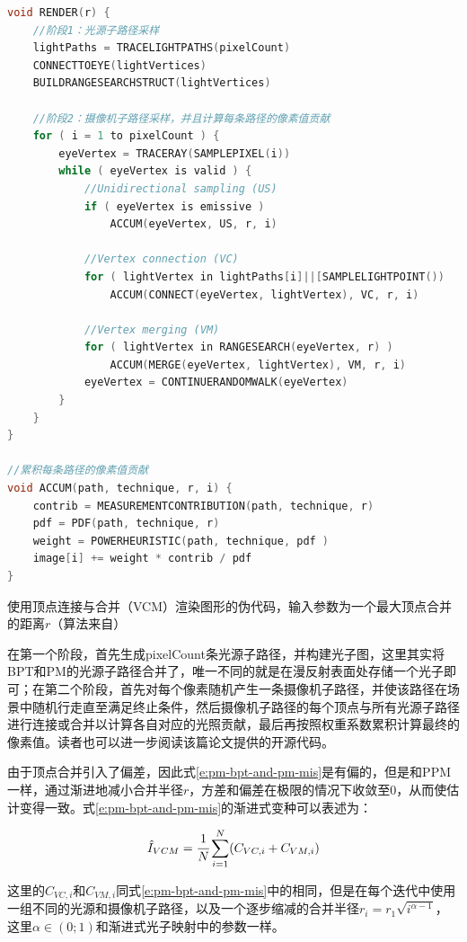 \begin{algorithm}
\begin{lstlisting}[language=C++, mathescape]
void RENDER(r) {
	//阶段1：光源子路径采样
	lightPaths = TRACELIGHTPATHS(pixelCount) 
	CONNECTTOEYE(lightVertices) 
	BUILDRANGESEARCHSTRUCT(lightVertices)
	
	//阶段2：摄像机子路径采样，并且计算每条路径的像素值贡献
	for ( i = 1 to pixelCount ) {
		eyeVertex = TRACERAY(SAMPLEPIXEL(i)) 
		while ( eyeVertex is valid ) {
			//Unidirectional sampling (US) 
			if ( eyeVertex is emissive )
				ACCUM(eyeVertex, US, r, i) 
			
			//Vertex connection (VC)
			for ( lightVertex in lightPaths[i]||[SAMPLELIGHTPOINT()) 
				ACCUM(CONNECT(eyeVertex, lightVertex), VC, r, i) 
		
			//Vertex merging (VM)
			for ( lightVertex in RANGESEARCH(eyeVertex, r) )
				ACCUM(MERGE(eyeVertex, lightVertex), VM, r, i) 
			eyeVertex = CONTINUERANDOMWALK(eyeVertex) 
		}
	}
}
		
//累积每条路径的像素值贡献
void ACCUM(path, technique, r, i) {
	contrib = MEASUREMENTCONTRIBUTION(path, technique, r) 
	pdf = PDF(path, technique, r)
	weight = POWERHEURISTIC(path, technique, pdf )
	image[i] += weight * contrib / pdf
}
\end{lstlisting}
\caption{使用顶点连接与合并（VCM）渲染图形的伪代码，输入参数为一个最大顶点合并的距离$r$（算法来自\cite{a:LightTransportSimulationwithVertexConnectionandMerging}）}
\label{a:pm-vcm}
\end{algorithm}

在第一个阶段，首先生成pixelCount条光源子路径，并构建光子图，这里其实将BPT和PM的光源子路径合并了，唯一不同的就是在漫反射表面处存储一个光子即可；在第二个阶段，首先对每个像素随机产生一条摄像机子路径，并使该路径在场景中随机行走直至满足终止条件，然后摄像机子路径的每个顶点与所有光源子路径进行连接或合并以计算各自对应的光照贡献，最后再按照权重系数累积计算最终的像素值。读者也可以进一步阅读该篇论文提供的开源代码\cite{m:SmallVCM}。

由于顶点合并引入了偏差，因此式\ref{e:pm-bpt-and-pm-mis}是有偏的，但是和PPM一样，通过渐进地减小合并半径$r$，方差和偏差在极限的情况下收敛至0，从而使估计变得一致。式\ref{e:pm-bpt-and-pm-mis}的渐进式变种可以表述为：

\begin{equation}
	\hat{I}_{VCM}= \cfrac{1}{N}\sum^{N}_{i=1}(C_{VC,i}+C_{VM,i})
\end{equation}

这里的$C_{VC,i}$和$C_{VM,i}$同式\ref{e:pm-bpt-and-pm-mis}中的相同，但是在每个迭代中使用一组不同的光源和摄像机子路径，以及一个逐步缩减的合并半径$r_i=r_1\sqrt{i^{\alpha-1}}$，这里$\alpha\in (0;1)$和渐进式光子映射中的参数一样。






